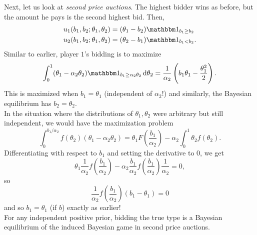 	\begin{fex}
		Next, let us look at \emph{second price auctions}. The highest bidder wins as before, but the amount he pays is the second highest bid. Then,
		\begin{align*}
			u_1(b_1,b_2;\theta_1,\theta_2) &= (\theta_1 - b_2) \indic_{b_1 \ge b_2} \\
			u_2(b_1,b_2;\theta_1,\theta_2) &= (\theta_2 - b_1) \indic_{b_1 < b_2}.
		\end{align*}
		Similar to earlier, player $1$'s bidding is to maximize
		\[ \int_0^1 (\theta_1 - \alpha_2 \theta_2) \indic_{b_1 \ge \alpha_2\theta_2} \dif \theta_2 = \frac{1}{\alpha_2} \left( b_1\theta_1 - \frac{\theta_1^2}{2} \right).  \]
		This is maximized when $b_1 = \theta_1$ (independent of $\alpha_2$!) and similarly, the Bayesian equilibrium has $b_2 = \theta_2$.\\

		In the situation where the distributions of $\theta_1,\theta_2$ were arbitrary but still independent, we would have the maximization problem
		\[ \int_{0}^{b_1/\alpha_2} f(\theta_2) (\theta_1 - \alpha_2\theta_2) = \theta_1 F\left( \frac{b_1}{\alpha_2} \right) - \alpha_2 \int_0^1 \theta_2 f(\theta_2). \]
		Differentiating with respect to $b_1$ and setting the derivative to $0$, we get
		\[ \theta_1 \frac{1}{\alpha_2} f\left( \frac{b_1}{\alpha_2} \right) - \alpha_2 \frac{b_1}{\alpha_2} f\left( \frac{b_1}{\alpha_2} \right) \frac{1}{\alpha_2} = 0, \]
		so
		\[ \frac{1}{\alpha_2} f\left( \frac{b_1}{\alpha_2} \right)(b_1 - \theta_1) = 0 \]
		and so $b_1 = \theta_1$ (if $b$) exactly as earlier!\\
		For any independent positive prior, bidding the true type is a Bayesian equilibrium of the induced Bayesian game in second price auctions.
	\end{fex}